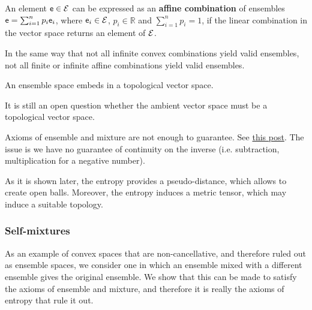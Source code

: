 \begin{defn}
	An element $\mathsf{e} \in \mathcal{E}$ can be expressed as an \textbf{affine combination} of ensembles $\mathsf{e} = \sum_{i=1}^{n} p_i \mathsf{e}_i$, where $\mathsf{e}_i \in \mathcal{E}$, $p_i \in \mathbb{R}$ and $\sum_{i=1}^{n} p_i = 1$, if the linear combination in the vector space returns an element of $\mathcal{E}$.
\end{defn}

\begin{remark}
	In the same way that not all infinite convex combinations yield valid ensembles, not all finite or infinite affine combinations yield valid ensembles.
\end{remark}

\begin{conj}\label{pm_es_ensemblesAreTVS}
	An ensemble space embeds in a topological vector space.
\end{conj}

\begin{remark}
	It is still an open question whether the ambient vector space must be a topological vector space. 
	
	Axioms of ensemble and mixture are not enough to guarantee. See \href{https://math.stackexchange.com/questions/4921905/cancellative-convex-spaces-and-topological-vector-spaces}{this post}. The issue is we have no guarantee of continuity on the inverse (i.e. subtraction, multiplication for a negative number).
	
	As it is shown later, the entropy provides a pseudo-distance, which allows to create open balls. Moreover, the entropy induces a metric tensor, which may induce a suitable topology.
\end{remark}

\subsubsection{Self-mixtures}


As an example of convex spaces that are non-cancellative, and therefore ruled out as ensemble spaces, we consider one in which an ensemble mixed with a different ensemble gives the original ensemble. We show that this can be made to satisfy the axioms of ensemble and mixture, and therefore it is really the axioms of entropy that rule it out.

